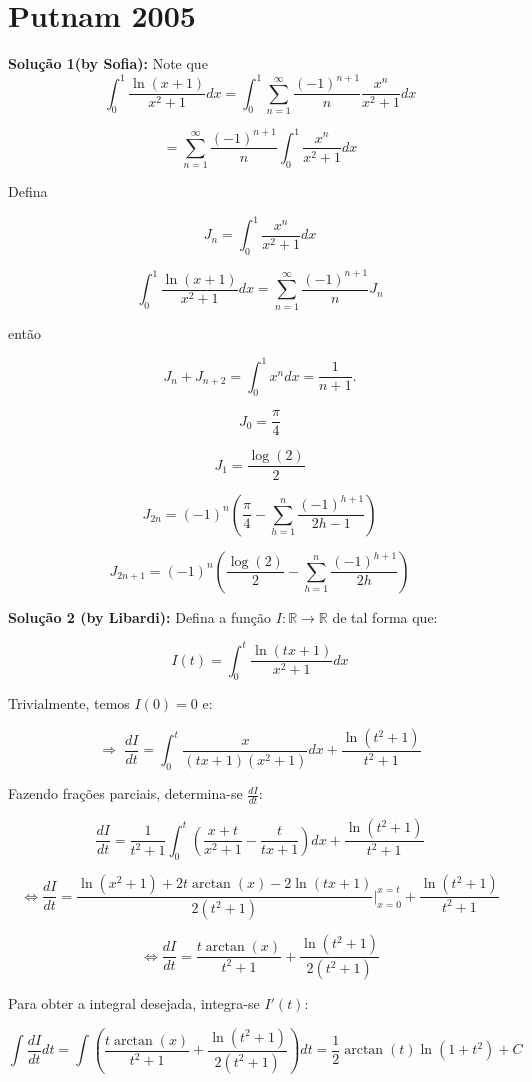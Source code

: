 \section{Putnam 2005}
\textbf{Solução 1(by Sofia):}
\newline
Note que
$$\int_0^1\frac{\ln(x+1)}{x^2+1}dx=\int_0^1\sum_{n=1}^\infty \frac{(-1)^{n+1}}{n}\frac{x^n}{x^2+1}dx$$

$$=\sum_{n=1}^\infty\frac{(-1)^{n+1}}{n}\int_0^1 \frac{x^n}{x^2+1}dx$$

Defina

$$J_n=\int_0^1 \frac{x^n}{x^2+1}dx$$

$$\int_0^1\frac{\ln(x+1)}{x^2+1}dx=\sum_{n=1}^\infty\frac{(-1)^{n+1}}{n}J_n$$

então

$$J_n+J_{n+2}=\int_0^1 x^n dx=\frac{1}{n+1}.$$

$$J_0=\frac\pi 4$$

$$J_1=\frac{\log(2)}{2}$$

$$J_{2n}=(-1)^n\left(\frac\pi 4-\sum_{h=1}^n\frac{(-1)^{h+1}}{2h-1}\right)$$

$$J_{2n+1}=(-1)^n\left(\frac{\log(2)}{2}-\sum_{h=1}^n\frac{(-1)^{h+1}}{2h}\right)$$

\newline
\textbf{Solução 2 (by Libardi):}
\newline
Defina a função $I:\mathbb{R}\rightarrow\mathbb{R}$ de tal forma que:

$$I(t) = \int_0^t\frac{\ln(tx+1)}{x^2+1}dx$$

Trivialmente, temos $I(0) = 0$ e:

$$\Rightarrow \; \frac{dI}{dt} = \int_0^t\frac{x}{(tx+1)(x^2+1)}dx+\frac{\ln(t^2+1)}{t^2+1}$$

Fazendo frações parciais, determina-se $\frac{dI}{dt}$:

$$\frac{dI}{dt} = \frac{1}{t^2+1}\int_0^t\left(\frac{x+t}{x^2+1}-\frac{t}{tx+1}\right)dx+\frac{\ln(t^2+1)}{t^2+1}$$

$$\Leftrightarrow \frac{dI}{dt} = \frac{\ln(x^2+1)+2t\arctan(x)-2\ln(tx+1)}{2(t^2+1)}\Big|_{x=0}^{x=t} + \frac{\ln(t^2+1)}{t^2+1}$$

$$\Leftrightarrow \frac{dI}{dt} = \frac{t\arctan(x)}{t^2+1} + \frac{\ln(t^2+1)}{2(t^2+1)}$$

Para obter a integral desejada, integra-se $I'(t)$:

$$\int \frac{dI}{dt}dt = \int\left(\frac{t\arctan(x)}{t^2+1} + \frac{\ln(t^2+1)}{2(t^2+1)}\right)dt = \frac{1}{2}\arctan(t)\ln(1+t^2) + C$$


